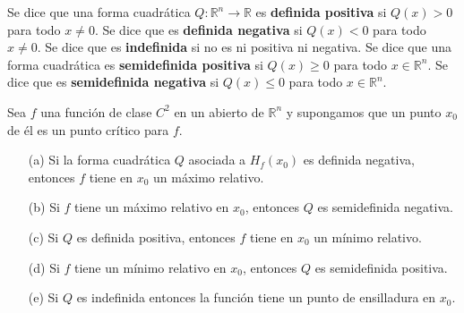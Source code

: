 \begin{definición}
    Se dice que una forma cuadrática $Q: \mathbb{R}^n \to \mathbb{R}$ es \textbf{definida positiva} si $Q(x) > 0$ para todo $x \neq 0$. Se dice que es \textbf{definida negativa} si $Q(x) < 0$ para todo $x \neq 0$. Se dice que es \textbf{indefinida} si no es ni positiva ni negativa.
    Se dice que una forma cuadrática es \textbf{semidefinida positiva} si $Q(x) \geq 0$ para todo $x \in \mathbb{R}^n$. Se dice que es \textbf{semidefinida negativa} si $Q(x) \leq 0$ para todo $x \in \mathbb{R}^n$.
\end{definición}
\begin{teorema}
    Sea $f$ una función de clase $C^2$ en un abierto de $\mathbb{R}^n$ y supongamos que un punto $x_0$ de él es un punto crítico para $f$.
    \begin{itemize}
        \item[(a)] Si la forma cuadrática $Q$ asociada a $H_f(x_0)$ es definida negativa, entonces $f$ tiene en $x_0$ un máximo relativo.
        \item[(b)] Si $f$ tiene un máximo relativo en $x_0$, entonces $Q$ es semidefinida negativa.
        \item[(c)] Si $Q$ es definida positiva, entonces $f$ tiene en $x_0$ un mínimo relativo.
        \item[(d)] Si $f$ tiene un mínimo relativo en $x_0$, entonces $Q$ es semidefinida positiva.
        \item[(e)] Si $Q$ es indefinida entonces la función tiene un punto de ensilladura en $x_0$.
    \end{itemize}
\end{teorema}
